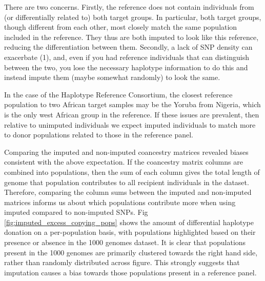 There are two concerns. Firstly, the reference does not contain individuals from (or differentially related to) both target groups. In particular, both target groups, though different from each other, most closely match the same population included in the reference. They thus are both imputed to look like this reference, reducing the differentiation between them. Secondly, a lack of SNP density can exacerbate (1), and, even if you had reference individuals that can distinguish between the two, you lose the necessary haplotype information to do this and instead impute them (maybe somewhat randomly) to look the same.


In the case of the Haplotype Reference Consortium, the closest reference population to two African target samples may be the Yoruba from Nigeria, which is the only west African group in the reference. If these issues are prevalent, then relative to unimputed individuals we expect imputed individuals to match more to donor populations related to those in the reference panel.


Comparing the imputed and non-imputed coancestry matrices revealed biases consistent with the above expectation. If the coancestry matrix columns are combined into populations, then the sum of each column gives the total length of genome that population contributes to all recipient individuals in the dataset. Therefore, comparing the column sums between the imputed and non-imputed matrices informs us about which populations contribute more when using imputed compared to non-imputed SNPs. Fig \ref{fig:imputed_excess_copying_pops} shows the amount of differential haplotype donation on a per-population basis, with populations highlighted based on their presence or absence in the 1000 genomes dataset. It is clear that populations present in the 1000 genomes are primarily clustered towards the right hand side, rather than randomly distributed across figure. This strongly suggests that imputation causes a bias towards those populations present in a reference panel. 

